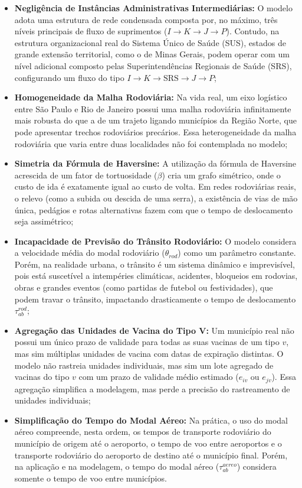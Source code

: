 \begin{itemize}
    \item \textbf{Negligência de Instâncias Administrativas Intermediárias:} O modelo adota uma estrutura de rede condensada composta por, no máximo, três níveis principais de fluxo de suprimentos ($I \to K \to J \to P$). Contudo, na estrutura organizacional real do Sistema Único de Saúde (SUS), estados de grande extensão territorial, como o de Minas Gerais, podem operar com um nível adicional composto pelas Superintendências Regionais de Saúde (SRS), configurando um fluxo do tipo $I \to K \to \text{SRS} \to J \to P$;
    \item \textbf{Homogeneidade da Malha Rodoviária:} Na vida real, um eixo logístico entre São Paulo e Rio de Janeiro possui uma malha rodoviária infinitamente mais robusta do que a de um trajeto ligando municípios da Região Norte, que pode apresentar trechos rodoviários precários. Essa heterogeneidade da malha rodoviária que varia entre duas localidades não foi contemplada no modelo;
    \item \textbf{Simetria da Fórmula de Haversine:} A utilização da fórmula de Haversine acrescida de um fator de tortuosidade ($\beta$) cria um grafo simétrico, onde o custo de ida é exatamente igual ao custo de volta. Em redes rodoviárias reais, o relevo (como a subida ou descida de uma serra), a existência de vias de mão única, pedágios e rotas alternativas fazem com que o tempo de deslocamento seja assimétrico;
    \item \textbf{Incapacidade de Previsão do Trânsito Rodoviário:} O modelo considera a velocidade média do modal rodoviário ($\theta_{rod}$) como um parâmetro constante. Porém, na realidade urbana, o trânsito é um sistema dinâmico e imprevisível, pois está suscetível a intempéries climáticas, acidentes, bloqueios em rodovias, obras e grandes eventos (como partidas de futebol ou festividades), que podem travar o trânsito, impactando drasticamente o tempo de deslocamento $\tau_{ab}^{rod}$;
    \item \textbf{Agregação das Unidades de Vacina do Tipo V:} Um município real não possui um único prazo de validade para todas as suas vacinas de um tipo $v$, mas sim múltiplas unidades de vacina com datas de expiração distintas. O modelo não rastreia unidades individuais, mas sim um lote agregado de vacinas do tipo $v$ com um prazo de validade médio estimado ($e_{iv}$ ou $e_{jv}$). Essa agregação simplifica a modelagem, mas perde a precisão do rastreamento de unidades individuais;
    \item \textbf{Simplificação do Tempo do Modal Aéreo:} Na prática, o uso do modal aéreo compreende, nesta ordem, os tempos de transporte rodoviário do município de origem até o aeroporto, o tempo de voo entre aeroportos e o transporte rodoviário do aeroporto de destino até o município final. Porém, na aplicação e na modelagem, o tempo do modal aéreo ($\tau_{ab}^{aereo}$) considera somente o tempo de voo entre municípios.
\end{itemize}

